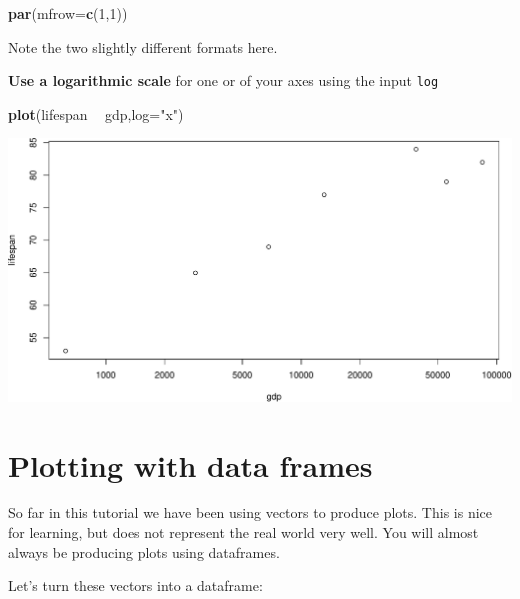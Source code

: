 \documentclass[]{book}
\newenvironment{Shaded}{\begin{snugshade}}{\end{snugshade}}
\newcommand{\DataTypeTok}[1]{\textcolor[rgb]{0.13,0.29,0.53}{#1}}
\newcommand{\DecValTok}[1]{\textcolor[rgb]{0.00,0.00,0.81}{#1}}
\newcommand{\KeywordTok}[1]{\textcolor[rgb]{0.13,0.29,0.53}{\textbf{#1}}}
\newcommand{\NormalTok}[1]{#1}
\newcommand{\OperatorTok}[1]{\textcolor[rgb]{0.81,0.36,0.00}{\textbf{#1}}}
\newcommand{\StringTok}[1]{\textcolor[rgb]{0.31,0.60,0.02}{#1}}
\begin{document}
\begin{Shaded}
\begin{Highlighting}[]
\KeywordTok{par}\NormalTok{(}\DataTypeTok{mfrow=}\KeywordTok{c}\NormalTok{(}\DecValTok{1}\NormalTok{,}\DecValTok{1}\NormalTok{))}
\end{Highlighting}
\end{Shaded}

Note the two slightly different formats here.

\textbf{Use a logarithmic scale} for one or of your axes using the input \texttt{log}

\begin{Shaded}
\begin{Highlighting}[]
\KeywordTok{plot}\NormalTok{(lifespan }\OperatorTok{~}\StringTok{ }\NormalTok{gdp,}\DataTypeTok{log=}\StringTok{"x"}\NormalTok{)}
\end{Highlighting}
\end{Shaded}

\includegraphics{figures/unnamed-chunk-239-1.pdf}

\hypertarget{plotting-with-data-frames}{%
\section*{Plotting with data frames}\label{plotting-with-data-frames}}

So far in this tutorial we have been using vectors to produce plots. This is nice for learning, but does not represent the real world very well. You will almost always be producing plots using dataframes.

Let's turn these vectors into a dataframe:
\end{document}
